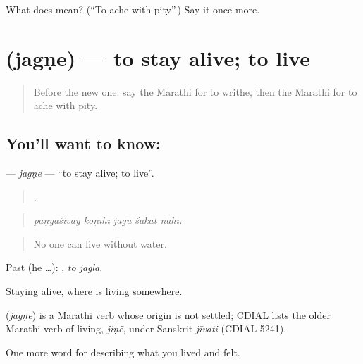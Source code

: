 \begin{tcolorbox}[breakable,colback=teal!4,colframe=teal!35!black,title={Before you move on}]
What does  mean? (\textquotedblleft{}To ache with pity\textquotedblright{}.) Say it once more.
\end{tcolorbox}
\section[\texorpdfstring{\mr{जगणे} (jagṇe)}{जगणे (jagṇe)}]{ (jagṇe) — to stay alive; to live}

\label{lesson:MR-C467-jagne-live}



\begin{quote}
Before the new one: say the Marathi for to writhe, then the Marathi for to ache with pity.
\end{quote}

\subsection*{You'll want to know: }
\textbf{} — \emph{jagṇe} — \textquotedblleft{}to stay alive; to live\textquotedblright{}.

\begin{quote}
    .
\end{quote}

\begin{quote}
\emph{pāṇyāśivāy koṇīhī jagū śakat nāhī.}
\end{quote}

\begin{quote}
No one can live without water.
\end{quote}

Past (he …):  , \emph{to jaglā}.

Staying alive, where  is living somewhere.

\begin{cousinweb}
\textbf{} (\emph{jagṇe}) is a Marathi verb whose origin is not settled; CDIAL lists the older Marathi verb of living, \emph{jiṇẽ}, under Sanskrit \emph{jīvati} (CDIAL 5241).
\end{cousinweb}

\begin{grammarlens}[title={What you've built}]
One more word for describing what you lived and felt.
\end{grammarlens}

